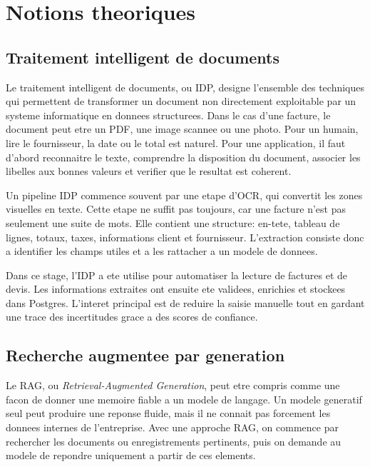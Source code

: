 \chapter{Notions theoriques}
\label{chap:notions-theoriques}

\section{Traitement intelligent de documents}

Le traitement intelligent de documents, ou IDP, designe l'ensemble des techniques qui permettent de transformer un document non directement exploitable par un systeme informatique en donnees structurees. Dans le cas d'une facture, le document peut etre un PDF, une image scannee ou une photo. Pour un humain, lire le fournisseur, la date ou le total est naturel. Pour une application, il faut d'abord reconnaitre le texte, comprendre la disposition du document, associer les libelles aux bonnes valeurs et verifier que le resultat est coherent.

Un pipeline IDP commence souvent par une etape d'OCR, qui convertit les zones visuelles en texte. Cette etape ne suffit pas toujours, car une facture n'est pas seulement une suite de mots. Elle contient une structure: en-tete, tableau de lignes, totaux, taxes, informations client et fournisseur. L'extraction consiste donc a identifier les champs utiles et a les rattacher a un modele de donnees.

Dans ce stage, l'IDP a ete utilise pour automatiser la lecture de factures et de devis. Les informations extraites ont ensuite ete validees, enrichies et stockees dans Postgres. L'interet principal est de reduire la saisie manuelle tout en gardant une trace des incertitudes grace a des scores de confiance.

\section{Recherche augmentee par generation}

Le RAG, ou \textit{Retrieval-Augmented Generation}, peut etre compris comme une facon de donner une memoire fiable a un modele de langage. Un modele generatif seul peut produire une reponse fluide, mais il ne connait pas forcement les donnees internes de l'entreprise. Avec une approche RAG, on commence par rechercher les documents ou enregistrements pertinents, puis on demande au modele de repondre uniquement a partir de ces elements.

